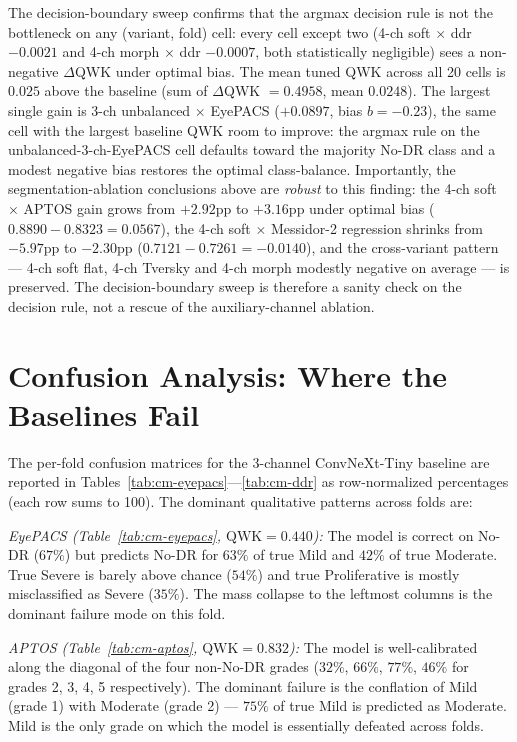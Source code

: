 \documentclass[11pt]{article}
\begin{document}
The decision-boundary sweep confirms that the argmax decision rule is not the bottleneck on any (variant, fold) cell: every cell except two (4-ch soft $\times$ ddr $-0.0021$ and 4-ch morph $\times$ ddr $-0.0007$, both statistically negligible) sees a non-negative $\Delta$QWK under optimal bias. The mean tuned QWK across all 20 cells is $0.025$ above the baseline (sum of $\Delta$QWK $= 0.4958$, mean $0.0248$). The largest single gain is 3-ch unbalanced $\times$ EyePACS ($+0.0897$, bias $b = -0.23$), the same cell with the largest baseline QWK room to improve: the argmax rule on the unbalanced-3-ch-EyePACS cell defaults toward the majority No-DR class and a modest negative bias restores the optimal class-balance. Importantly, the segmentation-ablation conclusions above are \emph{robust} to this finding: the 4-ch soft $\times$ APTOS gain grows from $+2.92$pp to $+3.16$pp under optimal bias ($0.8890 - 0.8323 = 0.0567$), the 4-ch soft $\times$ Messidor-2 regression shrinks from $-5.97$pp to $-2.30$pp ($0.7121 - 0.7261 = -0.0140$), and the cross-variant pattern --- 4-ch soft flat, 4-ch Tversky and 4-ch morph modestly negative on average --- is preserved. The decision-boundary sweep is therefore a sanity check on the decision rule, not a rescue of the auxiliary-channel ablation.

\section{Confusion Analysis: Where the Baselines Fail}

The per-fold confusion matrices for the 3-channel ConvNeXt-Tiny baseline are reported in Tables~\ref{tab:cm-eyepacs}---\ref{tab:cm-ddr} as row-normalized percentages (each row sums to 100). The dominant qualitative patterns across folds are:

\textit{EyePACS (Table~\ref{tab:cm-eyepacs}, $\mathrm{QWK} = 0.440$):} The model is correct on No-DR ($67\%$) but predicts No-DR for $63\%$ of true Mild and $42\%$ of true Moderate. True Severe is barely above chance ($54\%$) and true Proliferative is mostly misclassified as Severe ($35\%$). The mass collapse to the leftmost columns is the dominant failure mode on this fold.

\textit{APTOS (Table~\ref{tab:cm-aptos}, $\mathrm{QWK} = 0.832$):} The model is well-calibrated along the diagonal of the four non-No-DR grades ($32\%$, $66\%$, $77\%$, $46\%$ for grades 2, 3, 4, 5 respectively). The dominant failure is the conflation of Mild (grade 1) with Moderate (grade 2) --- $75\%$ of true Mild is predicted as Moderate. Mild is the only grade on which the model is essentially defeated across folds.
\end{document}
